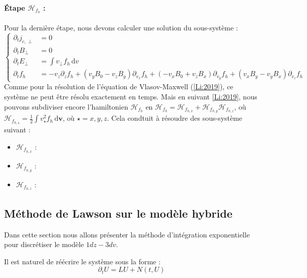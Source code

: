 \paragraph{Étape $\mathcal{H}_{f_h}$ :\\}

Pour la dernière étape, nous devons calculer une solution du sous-système :
$$
  \begin{cases}
    \partial_t  j_{c,\perp} &= 0 \\
    \partial_t B_\perp      &= 0 \\
    \partial_t E_\perp      &= \int v_\perp f_h\,\mathrm{d}v\\
    \partial_t f_h          &= -v_z\partial_zf_h + (v_yB_0-v_zB_y)\partial_{v_x}f_h + (-v_xB_0+v_zB_x)\partial_{v_y}f_h + (v_xB_y - v_yB_x)\partial_{v_z}f_h
  \end{cases}
$$
Comme pour la résolution de l'équation de Vlasov-Maxwell (\ref{Li:2019}), ce système ne peut être résolu exactement en temps. Mais en suivant \ref{Li:2019}, nous pouvons subdiviser encore l'hamiltonien $\mathcal{H}_{f_h}$ en $\mathcal{H}_{f_h}=\mathcal{H}_{f_{h,x}}+\mathcal{H}_{f_{h,y}}\mathcal{H}_{f_{h,z}}$, où $\mathcal{H}_{f_{h,\star}}=\frac{1}{2}\int v_{\star}^2 f_h\,\mathrm{d}\textbf{v}$, où $\star=x,y,z$. Cela condtuit à résoudre des sous-système suivant :
\begin{itemize}
  \item $\mathcal{H}_{f_{h,x}}$ :
  \item $\mathcal{H}_{f_{h,y}}$ :
  \item $\mathcal{H}_{f_{h,z}}$ :
\end{itemize}
 
\subsection{Méthode de Lawson sur le modèle hybride}

Dans cette section nous allons présenter la méthode d'intégration exponentielle pour discrétiser le modèle $1dz-3dv$.

Il est naturel de réécrire le système sous la forme :
$$
  \partial_t U = LU + N(t,U)
$$

